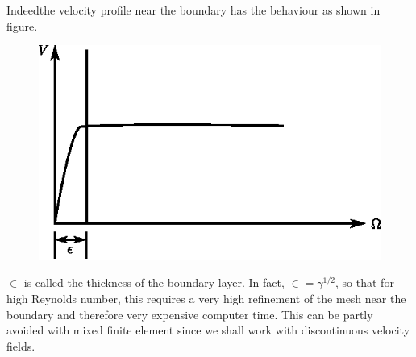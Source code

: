 Indeed\pageoriginale the velocity profile near the boundary has the
behaviour as shown in figure.
\begin{figure}[H]
\centering
\includegraphics{figure/addfig6.6.eps}
\caption{}\label{fig6.6}
\end{figure}
\noindent
$\in$ is called the thickness of the boundary layer. In fact,
$\in =\gamma^{1/2}$, so that for high Reynolds number, this
requires a very high refinement of the mesh near the boundary and
therefore very expensive computer time. This can be partly avoided
with mixed finite element since we shall work with discontinuous
velocity fields.


